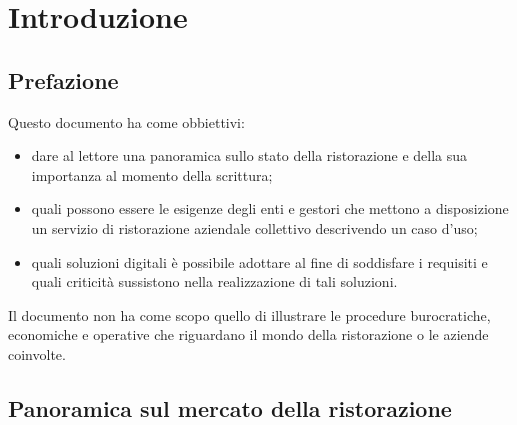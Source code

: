 \documentclass[a4paper, titlepage, 12pt, openright, twoside]{book}
\begin{document}
\begin{frontespizio}
\end{frontespizio}

\tableofcontents

\chapter{Introduzione}\label{chap:introduzione}

\section{Prefazione}

Questo documento ha come obbiettivi:
\begin{itemize}
	\item dare al lettore una panoramica sullo stato della ristorazione e della sua importanza al momento della scrittura;
	\item quali possono essere le esigenze degli enti e gestori che mettono a disposizione un servizio di ristorazione aziendale collettivo descrivendo un caso d'uso;
	\item quali soluzioni digitali è possibile adottare al fine di soddisfare i requisiti e quali criticità sussistono nella realizzazione di tali soluzioni.
\end{itemize}

Il documento non ha come scopo quello di illustrare le procedure burocratiche, economiche e operative che riguardano il mondo della ristorazione o le aziende coinvolte.

\section{Panoramica sul mercato della ristorazione}
\end{document}

